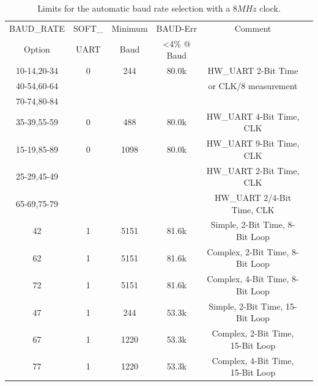 \begin{table}[H]
  \begin{center}
    \begin{tabular}{| c | c | c | c | c | c |}
    \hline
   BAUD\_RATE  & SOFT\_ & Minimum   & BAUD-Err & Comment  \\
   Option      & UART   & Baud      & \textless 4\% @ Baud &  \\
    \hline
    \hline
  10-14,20-34  &  0     &  244      &   80.0k  & HW\_UART 2-Bit Time  \\
  40-54,60-64  &        &           &          & or CLK/8 measurement    \\
  70-74,80-84  &        &           &          &                         \\
    \hline
  35-39,55-59  &  0     &  488      &   80.0k  & HW\_UART 4-Bit Time, CLK  \\
    \hline
  15-19,85-89  &  0     &  1098     &   80.0k  & HW\_UART 9-Bit Time, CLK  \\
  25-29,45-49  &        &           &          & HW\_UART 2-Bit Time, CLK \\
  65-69,75-79  &        &           &          & HW\_UART 2/4-Bit Time, CLK \\
    \hline
    42         &  1     &  5151     &   81.6k  &  Simple, 2-Bit Time, 8-Bit Loop  \\
    \hline
    62         &  1     &  5151     &   81.6k  & Complex, 2-Bit Time, 8-Bit Loop  \\
    \hline
    72         &  1     &  5151     &   81.6k  & Complex, 4-Bit Time, 8-Bit Loop  \\
    \hline
    47         &  1     &  244      &   53.3k  &  Simple, 2-Bit Time, 15-Bit Loop \\
    \hline
    67         &  1     &  1220     &   53.3k  & Complex, 2-Bit Time, 15-Bit Loop \\
    \hline
    77         &  1     &  1220     &   53.3k  & Complex, 4-Bit Time, 15-Bit Loop \\
    \hline
    \end{tabular}
  \end{center}
  \caption{Limits for the automatic baud rate selection with a \(8MHz\) clock.}
  \label{tab:AutoBaud8}
\end{table}


